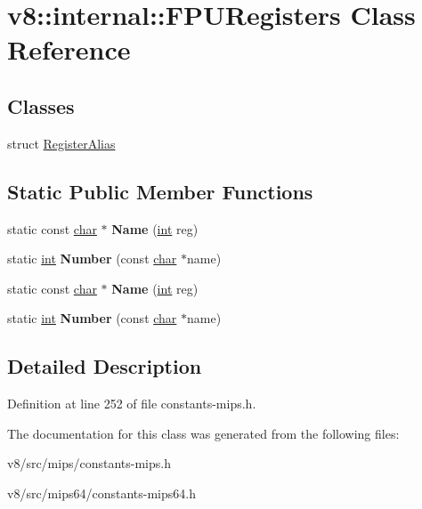 \hypertarget{classv8_1_1internal_1_1FPURegisters}{}\section{v8\+:\+:internal\+:\+:F\+P\+U\+Registers Class Reference}
\label{classv8_1_1internal_1_1FPURegisters}
\subsection*{Classes}
\begin{DoxyCompactItemize}
\item 
struct \mbox{\hyperlink{structv8_1_1internal_1_1FPURegisters_1_1RegisterAlias}{Register\+Alias}}
\end{DoxyCompactItemize}
\subsection*{Static Public Member Functions}
\begin{DoxyCompactItemize}
\item 
\mbox{\label{classv8_1_1internal_1_1FPURegisters_a41da2287371f264eb90d3ea1920f695e}} 
static const \mbox{\hyperlink{classchar}{char}} $\ast$ {\bfseries Name} (\mbox{\hyperlink{classint}{int}} reg)
\item 
\mbox{\label{classv8_1_1internal_1_1FPURegisters_a2b6d1b5b43862af2b655f2e8e5d434f0}} 
static \mbox{\hyperlink{classint}{int}} {\bfseries Number} (const \mbox{\hyperlink{classchar}{char}} $\ast$name)
\item 
\mbox{\label{classv8_1_1internal_1_1FPURegisters_a41da2287371f264eb90d3ea1920f695e}} 
static const \mbox{\hyperlink{classchar}{char}} $\ast$ {\bfseries Name} (\mbox{\hyperlink{classint}{int}} reg)
\item 
\mbox{\label{classv8_1_1internal_1_1FPURegisters_a2b6d1b5b43862af2b655f2e8e5d434f0}} 
static \mbox{\hyperlink{classint}{int}} {\bfseries Number} (const \mbox{\hyperlink{classchar}{char}} $\ast$name)
\end{DoxyCompactItemize}


\subsection{Detailed Description}


Definition at line 252 of file constants-\/mips.\+h.



The documentation for this class was generated from the following files\+:\begin{DoxyCompactItemize}
\item 
v8/src/mips/constants-\/mips.\+h\item 
v8/src/mips64/constants-\/mips64.\+h\end{DoxyCompactItemize}
